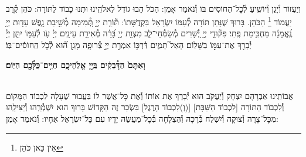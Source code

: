 \documentclass[twoside, openany, parskip=half, 11pt]{book}
\begin{document}
\avharachamim

\\
וְיַעֲזוֹר וְ֯יָגֵן וְ֯יוֹשִֽׁיעַ לְ֯כׇל־הַחוֹסִים בּוֹ וְ֯נֹאמַר אָמֵן:
הַכֹּל הָבוּ גוֹדֶל לֵאלֹהֵֽינוּ וּתְנוּ כָבוֹד לַתּוֹרָה: כֹּהֵן קְ֯רָב יַעֲמוֹד
\footnote{ אֵין כַּאן כֹּהֵן}
הַכֹּהֵן. בָּרוּךְ שֶׁנָּתַן תּוֹרָה לְ֯עַמּוֹ יִשְׂרָאֵל בִּקְדֻשָּׁתוֹ:
תּ֘וֹרַ֤ת יְיָ֣ תְּ֭֯מִימָה מְ֯שִׁ֣יבַת נָ֑פֶשׁ עֵד֖וּת יְיָ֥ נֶֽ֝אֱמָנָ֗ה מַחְכִּ֥ימַת פֶּֽתִי׃ פִּקּ֘וּדֵ֤י יְיָ֣ יְ֭֯שָׁרִים מְ֯שַׂמְּ֯חֵי־לֵ֑ב מִצְוַ֖ת יְיָ֥ בָּ֝רָ֗ה מְ֯אִירַ֥ת עֵינָֽיִם׃
יְיָ֗ עֹ֖ז לְ֯עַמּ֣וֹ יִתֵּ֑ן יְיָ֓ יְ֯בָרֵ֖ךְ אֶת־עַמּ֣וֹ בַשָּׁלֽוֹם׃
הָאֵל֮ תָּמִ֢ים דַּ֫רְכּ֥וֹ אִמְרַ֣ת יְיָ֣ צְ֯רוּפָ֑ה מָגֵ֥ן ה֝֗וּא לְ֯כֹ֤ל הַֽחוֹסִ֬ים־בּֽוֹ׃


\textbf{וְאַתֶּם֙ הַדְּ֯בֵקִ֔ים בַּֽיְ֖יָ אֱלֹֽהֵיכֶ֑ם חַיִּ֥ים־כֻּלְּ֯כֶ֖ם הַיּֽוֹם׃} 

\nextpage

\torahbarachu

\hagomel

\\
אֲבוֹתֵֽינוּ אַבְרָהָם יִצְחָק וְ֯יַעֲקֹב הוּא יְ֯בָרֵךְ אֶת
אוֹתוֹ וְ֯אֶת כׇּל־אֲשֶׁר לוֹ
בַּעֲבוּר שֶׁעָלָה לִכְבוֹד הַמָּקוֹם וְ֯לִכְבוֹד הַתּוֹרָה
[לִכְבוֹד הַשַּׁבָּת]
[(וְ)לִכְבוֹד הָרֶגֶל]
בִּשְׂכַר זֶה הַקָּדוֹשׁ בָּרוּךְ הוּא יִשְׁמְ֯רֵֽהוּ וְ֯יַצִּילֵֽהוּ מִכׇּל־צָרָה וְ֯צוּקָה וְ֯יִשְׁלַח בְּ֯רָכָה וְ֯הַצְלָחָה בְּ֯כׇל־מַעֲשֵׂה יָדָיו עִם כׇּל־יִשְׂרָאֵל אֶחָיו: וְ֯נֹאמַר אָמֵן:
\end{document}
